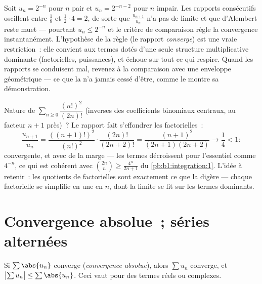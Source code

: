 \begin{example}\label{ex:b1:series:rationotnecessary}
Soit $u_n = 2^{-n}$ pour $n$ pair et $u_n = 2^{-n-2}$ pour $n$
impair. Les rapports consécutifs oscillent entre $\frac{1}{8}$ et
$\frac12\cdot4 = 2$, de sorte que $\frac{u_{n+1}}{u_n}$ n'a pas de
limite et que d'Alembert reste muet --- pourtant $u_n \leq 2^{-n}$
et le critère de comparaison règle la convergence instantanément.
L'hypothèse de la règle (le rapport \emph{converge}) est une vraie
restriction~: elle convient aux termes dotés d'une seule structure
multiplicative dominante (factorielles, puissances), et échoue sur
tout ce qui respire. Quand les rapports se conduisent mal, revenez à
la comparaison avec une enveloppe géométrique --- ce que la  n'a jamais cessé d'être, comme le montre sa démonstration.
\end{example}

\begin{example}\label{ex:b1:series:ratiobinom}
Nature de $\sum_{n\geq0} \dfrac{(n!)^2}{(2n)!}$ (inverses des
coefficients binomiaux centraux, au facteur $n + 1$ près)~? Le
rapport fait s'effondrer les factorielles~:
\[
\frac{u_{n+1}}{u_n}
= \frac{((n+1)!)^2}{(n!)^2}\cdot\frac{(2n)!}{(2n+2)!}
= \frac{(n+1)^2}{(2n+1)(2n+2)}
\longrightarrow \frac14 < 1 :
\]
convergente, et avec de la marge --- les termes décroissent pour
l'essentiel comme $4^{-n}$, ce qui est cohérent avec
$\binom{2n}{n} \geq \frac{4^n}{2n+1}$ du \cref{pb:b1:integration:1}.
L'idée à retenir~: les quotients de factorielles sont exactement ce
que la  digère --- chaque factorielle se simplifie
en une  en $n$, dont la limite se lit sur les
termes dominants.
\end{example}

\section{Convergence absolue~; séries alternées}

\begin{theorem}\label{thm:b1:series:absolute}
Si $\sum \abs{u_n}$ converge (\emph{convergence
absolue}), alors $\sum u_n$ converge, et
$\bigl|\sum u_n\bigr| \leq \sum \abs{u_n}$. Ceci vaut pour des termes
réels ou complexes.
\end{theorem}

